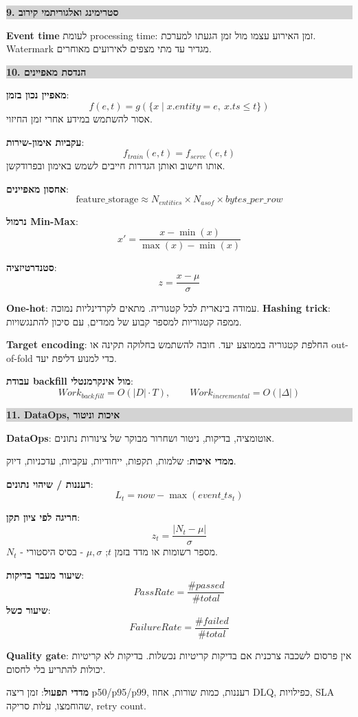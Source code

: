 \documentclass[10pt,a4paper]{article}
\newcommand{\eng}[1]{\textenglish{#1}}
\newcommand{\term}[1]{\textbf{#1}}
\newcommand{\formula}[1]{\[
#1
\]}
\newenvironment{cheatbox}[1]{
  \vspace{2pt}
  \noindent\colorbox{lightgray}{\parbox{\dimexpr\linewidth-2\fboxsep}{\textbf{\color{sectionblue}#1}}}
  \vspace{2pt}
}{\vspace{3pt}}
\begin{document}
\begin{multicols}{2}
\begin{cheatbox}{9. סטרימינג ואלגוריתמי קירוב}
\term{\eng{Event time}} לעומת \eng{processing time}: זמן האירוע עצמו מול זמן הגעתו למערכת. \eng{Watermark} מגדיר עד מתי מצפים לאירועים מאוחרים.
\end{cheatbox}

\begin{cheatbox}{10. הנדסת מאפיינים}
\term{מאפיין נכון בזמן}:
\formula{f(e,t)=g(\{x\mid x.entity=e,\ x.ts\le t\})}
אסור להשתמש במידע אחרי זמן החיזוי.

\term{עקביות אימון-שירות}:
\formula{f_{train}(e,t)=f_{serve}(e,t)}
אותו חישוב ואותן הגדרות חייבים לשמש באימון ובפרודקשן.

\term{אחסון מאפיינים}:
\formula{\text{feature\_storage}\approx N_{entities}\times N_{asof}\times bytes\_per\_row}

\term{נרמול \eng{Min-Max}}:
\formula{x'=\frac{x-\min(x)}{\max(x)-\min(x)}}

\term{סטנדרטיזציה}:
\formula{z=\frac{x-\mu}{\sigma}}

\term{\eng{One-hot}}: עמודה בינארית לכל קטגוריה. מתאים לקרדינליות נמוכה. \term{\eng{Hashing trick}}: ממפה קטגוריות למספר קבוע של ממדים, עם סיכון להתנגשויות.

\term{\eng{Target encoding}}: החלפת קטגוריה בממוצע יעד. חובה להשתמש בחלוקה תקינה או \eng{out-of-fold} כדי למנוע דליפת יעד.

\term{עבודת \eng{backfill} מול אינקרמנטלי}:
\formula{Work_{backfill}=O(|D|\cdot T),\qquad Work_{incremental}=O(|\Delta|)}
\end{cheatbox}

\begin{cheatbox}{11. \eng{DataOps}, איכות וניטור}
\term{\eng{DataOps}}: אוטומציה, בדיקות, ניטור ושחרור מבוקר של צינורות נתונים.

\term{ממדי איכות}: שלמות, תקפות, ייחודיות, עקביות, עדכניות, דיוק.

\term{רעננות / שיהוי נתונים}:
\formula{L_t=now-\max(event\_ts_t)}

\term{חריגה לפי ציון תקן}:
\formula{z_t=\frac{|N_t-\mu|}{\sigma}}
$N_t$ - מספר רשומות או מדד בזמן $t$; $\mu,\sigma$ - בסיס היסטורי.

\term{שיעור מעבר בדיקות}:
\formula{PassRate=\frac{\#passed}{\#total}}
\term{שיעור כשל}:
\formula{FailureRate=\frac{\#failed}{\#total}}

\term{\eng{Quality gate}}: אין פרסום לשכבה צרכנית אם בדיקות קריטיות נכשלות. בדיקות לא קריטיות יכולות להתריע בלי לחסום.

\term{מדדי תפעול}: זמן ריצה p50/p95/p99, רעננות, כמות שורות, אחוז \eng{DLQ}, כפילויות, \eng{SLA} שהוחמצו, עלות סריקה, \eng{retry count}.
\end{cheatbox}


\end{multicols}
\end{document}
